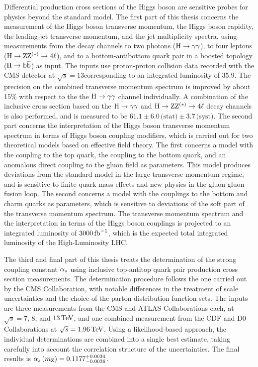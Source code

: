 


Differential production cross sections of the Higgs boson are sensitive probes for physics beyond the standard model.
% 
The first part of this thesis concerns the measurement of the Higgs boson transverse momentum, the Higgs boson rapidity, the leading-jet transverse momentum, and the jet multiplicity spectra, using measurements from the decay channels to two photons ($\mathrm{H}\to\mathrm{\gamma}\mathrm{\gamma}$), to four leptons ($\mathrm{H}\to\mathrm{Z}\mathrm{Z}^{(\ast)}\to 4\ell$), and to a bottom-antibottom quark pair in a boosted topology ($\mathrm{H}\to\mathrm{b}\overline{\mathrm{b}}$) as input.
% 
The inputs use proton-proton collision data recorded with the CMS detector at $\sqrt{s}=13$\TeV corresponding to an integrated luminosity of 35.9\fbinv.
% 
The precision on the combined transverse momentum spectrum is improved by about 15\% with respect to the the $\mathrm{H}\to\mathrm{\gamma}\mathrm{\gamma}$ channel individually.
% 
A combination of the inclusive cross section based on the $\mathrm{H}\to\mathrm{\gamma}\mathrm{\gamma}$ and $\mathrm{H}\to\mathrm{Z}\mathrm{Z}^{(\ast)}\to 4\ell$ decay channels is also performed, and is measured to be $61.1   \pm 6.0 \,\text{(stat)} \pm 3.7 \,\text{(syst)}$\pb.
% 
The second part concerns the interpretation of the Higgs boson transverse momentum spectrum in terms of Higgs boson coupling modifiers, which is carried out for two theoretical models based on effective field theory.
% 
The first concerns a model with the coupling to the top quark, the coupling to the bottom quark, and an anomalous direct coupling to the gluon field as parameters.
% 
This model produces deviations from the standard model in the large transverse momentum regime, and is sensitive to finite quark mass effects and new physics in the gluon-gluon fusion loop.
% 
The second concerns a model with the couplings to the bottom and charm quarks as parameters, which is sensitive to deviations of the soft part of the transverse momentum spectrum.
% 
The transverse momentum spectrum and the interpretation in terms of the Higgs boson couplings is projected to an integrated luminosity of $3000\,\text{fb}^{-1}$, which is the expected total integrated luminosity of the High-Luminosity LHC.


The third and final part of this thesis treats the determination of the strong coupling constant $\alpha_s$ using inclusive top-antitop quark pair production cross section measurements.
% 
The determination procedure follows the one carried out by the CMS Collaboration, with notable differences in the treatment of scale uncertainties and the choice of the parton distribution function sets.
% 
The inputs are three measurements from the CMS and ATLAS Collaborations each, at $\sqrt{s}=7$, $8$, and $13\,\text{TeV}$, and one combined measurement from the CDF and D0 Collaborations at $\sqrt{s}=1.96\,\text{TeV}$.
% 
Using a likelihood-based approach, the individual determinations are combined into a single best estimate, taking carefully into account the correlation structure of the uncertainties.
% 
The final results is $\alpha_s \left( m_\mathrm{Z} \right)  = 0.1177^{+0.0034}_{-0.0036}$.








